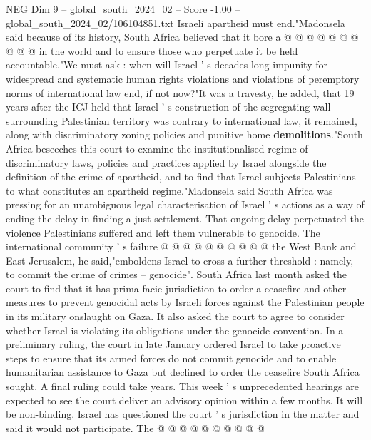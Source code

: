 \begin{textsample}{NEG Dim 9 – global\_south\_2024\_02 – Score -1.00 – global\_south\_2024\_02/106104851.txt}
Israeli apartheid must end."Madonsela said because of its history, South Africa believed that it bore a @ @ @ @ @ @ @ @ @ @ in the world and to ensure those who perpetuate it be held accountable."We must ask : when will Israel ' s decades-long impunity for widespread and systematic human rights violations and violations of peremptory norms of international law end, if not now?"It was a travesty, he added, that 19 years after the ICJ held that Israel ' s construction of the segregating wall surrounding Palestinian territory was contrary to international law, it remained, along with discriminatory zoning policies and punitive home \textbf{demolitions}."South Africa beseeches this court to examine the institutionalised regime of discriminatory laws, policies and practices applied by Israel alongside the definition of the crime of apartheid, and to find that Israel subjects Palestinians to what constitutes an apartheid regime."Madonsela said South Africa was pressing for an unambiguous legal characterisation of Israel ' s actions as a way of ending the delay in finding a just settlement.
That ongoing delay perpetuated the violence Palestinians suffered and left them vulnerable to genocide.
The international community ' s failure @ @ @ @ @ @ @ @ @ @ the West Bank and East Jerusalem, he said,"emboldens Israel to cross a further threshold : namely, to commit the crime of crimes -- genocide".
South Africa last month asked the court to find that it has prima facie jurisdiction to order a ceasefire and other measures to prevent genocidal acts by Israeli forces against the Palestinian people in its military onslaught on Gaza.
It also asked the court to agree to consider whether Israel is violating its obligations under the genocide convention.
In a preliminary ruling, the court in late January ordered Israel to take proactive steps to ensure that its armed forces do not commit genocide and to enable humanitarian assistance to Gaza but declined to order the ceasefire South Africa sought.
A final ruling could take years.
This week ' s unprecedented hearings are expected to see the court deliver an advisory opinion within a few months.
It will be non-binding.
Israel has questioned the court ' s jurisdiction in the matter and said it would not participate.
The @ @ @ @ @ @ @ @ @ @

\end{textsample}
